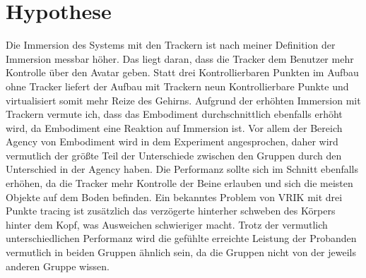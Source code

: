 \section{Hypothese}
Die Immersion des Systems mit den Trackern ist nach meiner Definition der Immersion messbar höher. Das liegt daran, dass die Tracker dem Benutzer mehr Kontrolle über den Avatar geben. Statt drei Kontrollierbaren Punkten im Aufbau ohne Tracker liefert der Aufbau mit Trackern neun Kontrollierbare Punkte und virtualisiert somit mehr Reize des Gehirns.
Aufgrund der erhöhten Immersion mit Trackern vermute ich, dass das Embodiment durchschnittlich ebenfalls erhöht wird, da Embodiment eine Reaktion auf Immersion ist. Vor allem der Bereich Agency von Embodiment wird in dem Experiment angesprochen, daher wird vermutlich der größte Teil der Unterschiede zwischen den Gruppen durch den Unterschied in der Agency haben.
Die Performanz sollte sich im Schnitt ebenfalls erhöhen, da die Tracker mehr Kontrolle der Beine erlauben und sich die meisten Objekte auf dem Boden befinden. Ein bekanntes Problem von VRIK mit drei Punkte tracing ist zusätzlich das verzögerte hinterher schweben des Körpers hinter dem Kopf, was Ausweichen schwieriger macht. Trotz der vermutlich unterschiedlichen Performanz wird die gefühlte erreichte Leistung der Probanden vermutlich in beiden Gruppen ähnlich sein, da die Gruppen nicht von der jeweils anderen Gruppe wissen.



